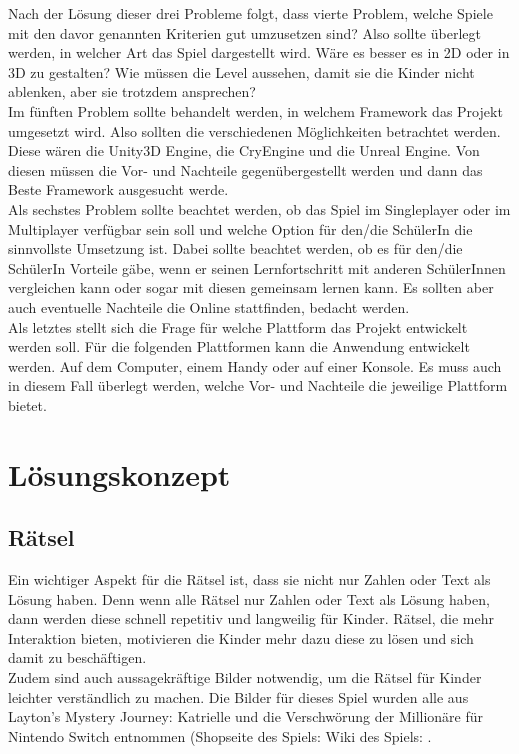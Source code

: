 Nach der Lösung dieser drei Probleme folgt, dass vierte Problem, welche Spiele mit den davor genannten Kriterien gut umzusetzen sind? Also sollte überlegt werden, in welcher Art das Spiel dargestellt wird. Wäre es besser es in 2D oder in 3D zu gestalten? Wie müssen die Level aussehen, damit sie die Kinder nicht ablenken, aber sie trotzdem ansprechen?
\\

Im fünften Problem sollte behandelt werden, in welchem Framework das Projekt umgesetzt wird. Also sollten die verschiedenen Möglichkeiten betrachtet werden. Diese wären die Unity3D Engine, die CryEngine und die Unreal Engine. Von diesen müssen die Vor- und Nachteile gegenübergestellt werden und dann das Beste Framework ausgesucht werde.
\\

Als sechstes Problem sollte beachtet werden, ob das Spiel im Singleplayer oder im Multiplayer verfügbar sein soll und welche Option für den/die SchülerIn die sinnvollste Umsetzung ist. Dabei sollte beachtet werden, ob es für den/die SchülerIn Vorteile gäbe, wenn er seinen Lernfortschritt mit anderen SchülerInnen vergleichen kann oder sogar mit diesen gemeinsam lernen kann. Es sollten aber auch eventuelle Nachteile die Online stattfinden, bedacht werden.
\\
Als letztes stellt sich die Frage für welche Plattform das Projekt entwickelt werden soll. Für die folgenden Plattformen kann die Anwendung entwickelt werden. Auf dem Computer, einem Handy oder auf einer Konsole. Es muss auch in diesem Fall überlegt werden, welche Vor- und Nachteile die jeweilige Plattform bietet.

\chapter{Lösungskonzept}
\label{cha:loesungskonzept}

\section{Rätsel}
Ein wichtiger Aspekt für die Rätsel ist, dass sie nicht nur Zahlen oder Text als Lösung haben. Denn wenn alle Rätsel nur Zahlen oder Text als Lösung haben, dann werden diese schnell repetitiv und langweilig für Kinder. Rätsel, die mehr Interaktion bieten, motivieren die Kinder mehr dazu diese zu lösen und sich damit zu beschäftigen.\\
Zudem sind auch aussagekräftige Bilder notwendig, um die Rätsel für Kinder leichter verständlich zu machen. Die Bilder für dieses Spiel wurden alle aus Layton’s Mystery Journey: Katrielle und die Verschwörung der Millionäre für Nintendo Switch entnommen (Shopseite des Spiels: \autocite{Layton:Shop} Wiki des Spiels: \autocite{Layton:Wiki}.\\

